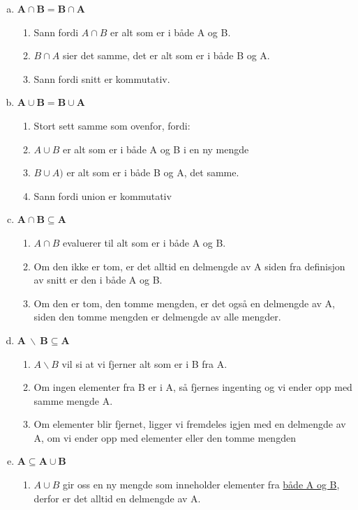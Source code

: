 \documentclass{article}
\begin{document}
\begin{enumerate}[a.]
    \item \(\mathbf{A \cap B = B \cap A}\)
    \begin{enumerate}[-]
        \item Sann fordi \(A \cap B\) er alt som er i både A og B.
        \item \(B \cap A\) sier det samme, det er alt som er i både B og A.
        \item Sann fordi snitt er kommutativ.
    \end{enumerate} 
    \item \(\mathbf{A \cup B = B \cup A}\)
    \begin{enumerate}[-]
        \item Stort sett samme som ovenfor, fordi:
        \item \(A \cup B\) er alt som er i både A og B i en ny mengde
        \item \(B \cup A)\) er alt som er i både B og A, det samme.
        \item Sann fordi union er kommutativ
    \end{enumerate} 
    \item \(\mathbf{A \cap B \subseteq A}\)
    \begin{enumerate}[-]
        \item \(A \cap B\) evaluerer til alt som er i både A og B.
        \item Om den ikke er tom, er det alltid en delmengde av A siden fra definisjon av snitt er den i både A og B.
        \item Om den er tom, den tomme mengden, er det også en delmengde av A, siden den tomme mengden er delmengde av alle mengder.
    \end{enumerate}
    \item \(\mathbf{A \ \backslash\ B \subseteq A}\)
    \begin{enumerate}[-]
        \item \(A \backslash B\) vil si at vi fjerner alt som er i B fra A. 
        \item Om ingen elementer fra B er i A, så fjernes ingenting og vi ender opp med samme mengde A.
        \item Om elementer blir fjernet, ligger vi fremdeles igjen med en delmengde av A, om vi ender opp med elementer eller den tomme mengden
    \end{enumerate}
    \item \(\mathbf{A \subseteq A \cup B}\)
    \begin{enumerate}[-]
        \item \(A \cup B\) gir oss en ny mengde som inneholder elementer fra \underline{både A og B}, derfor er det alltid en delmengde av A.
    \end{enumerate}
\end{enumerate}
\end{document}
